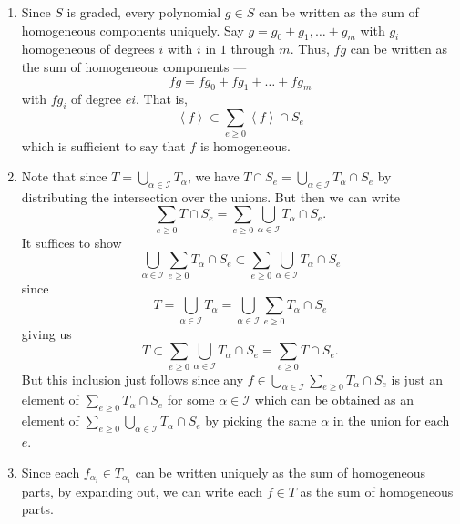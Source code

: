\documentclass[12 pt, letterpaper]{hmcpset}
\begin{document}
\begin{solution}
	\begin{enumerate}
		\item Since $S$ is graded, every polynomial $g \in S$ can be written as the sum of homogeneous components uniquely. Say $g = g_{0} + g_{1}, \dots + g_{m}$ with $g_{i}$ homogeneous of degrees $i$ with $i$ in $1$ through $m$. Thus, $fg$ can be written as the sum of homogeneous components ---
			\[
				fg = fg_{0} + fg_{1} + \dots + fg_{m}
			\]
			with $f g_{i}$ of degree $ei$. That is,
			\[
				\left < f \right > \subset \sum_{e \ge 0} \left < f \right > \cap S_{e}
			\]
			which is sufficient to say that $f$ is homogeneous.
		\item Note that since $T = \bigcup_{\alpha \in \mathcal{I}} T_{\alpha}$, we have $T \cap S_{e} = \bigcup_{\alpha \in \mathcal{I}} T_{\alpha} \cap S_{e}$ by distributing the intersection over the unions. But then we can write
			\begin{equation*}
				\sum_{e \ge 0} T \cap S_{e} = \sum_{e \ge 0} \bigcup_{\alpha \in \mathcal{I}} T_{\alpha} \cap S_{e}.
			\end{equation*}
			It suffices to show
			\[
				\bigcup_{\alpha \in \mathcal{I}} \sum_{e \ge 0} T_{\alpha} \cap S_{e} \subset \sum_{e \ge 0} \bigcup_{\alpha \in \mathcal{I}} T_{\alpha} \cap S_{e}
			\]
			since
			\[
				T = \bigcup_{\alpha \in \mathcal{I}} T_{\alpha} = \bigcup_{\alpha \in \mathcal{I}} \sum_{e \ge 0} T_{\alpha} \cap S_{e}
			\]
			giving us
			\[
				T \subset \sum_{e \ge 0} \bigcup_{\alpha \in \mathcal{I}} T_{\alpha} \cap S_{e} = \sum_{e \ge 0} T \cap S_{e}.
			\]
			But this inclusion just follows since any $f \in \bigcup_{\alpha \in \mathcal{I}} \sum_{e \ge 0} T_{\alpha} \cap S_{e}$ is just an element of $\sum_{e \ge 0} T_{\alpha} \cap S_{e}$ for some $\alpha \in \mathcal{I}$ which can be obtained as an element of $\sum_{e \ge 0} \bigcup_{\alpha \in \mathcal{I}} T_{\alpha} \cap S_{e}$ by picking the same $\alpha$ in the union for each $e$.
		\item Since each $f_{\alpha_{i}} \in T_{\alpha_{i}}$ can be written uniquely as the sum of homogeneous parts, by expanding out, we can write each $f \in T$ as the sum of homogeneous parts. 
	\end{enumerate}
\end{solution}

\pagebreak
\end{document}
